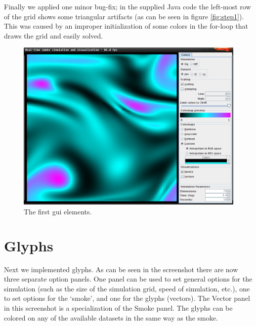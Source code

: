 \documentclass[a4paper,11pt,twoside]{report}
\begin{document}
		Finally we applied one minor bug-fix; in the supplied Java code the left-most row of the grid shows some triangular artifacts (as can be seen in figure \ref{fig:step1}). This was caused by an improper initialization of some colors in the for-loop that draws the grid and easily solved.
		\begin{figure}[h]
		\centering
		\includegraphics[scale=\imagescalefactor]{images/step2.png}
		\caption{The first gui elements.}\label{fig:step2}
		\end{figure}
		\clearpage
	\section{Glyphs}
		Next we implemented glyphs. As can be seen in the screenshot there are now three separate option panels. One panel can be used to set general options for the simulation (such as the size of the simulation grid, speed of simulation, etc.), one to set options for the `smoke', and one for the glyphs (vectors). The Vector panel in this screenshot is a specialization of the Smoke panel. The glyphs can be colored on any of the available datasets in the same way as the smoke.
\end{document}
